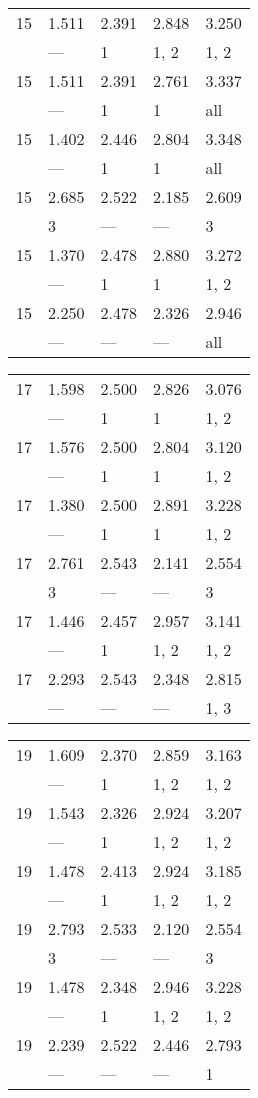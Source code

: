 \begin{tabular}{lllll}
\toprule
 15 & 1.511 & 2.391 & 2.848 & 3.250 \\
    & ---   & 1     & 1, 2  & 1, 2  \\
 15 & 1.511 & 2.391 & 2.761 & 3.337 \\
    & ---   & 1     & 1     & all   \\
 15 & 1.402 & 2.446 & 2.804 & 3.348 \\
    & ---   & 1     & 1     & all   \\
 15 & 2.685 & 2.522 & 2.185 & 2.609 \\
    & 3     & ---   & ---   & 3     \\
 15 & 1.370 & 2.478 & 2.880 & 3.272 \\
    & ---   & 1     & 1     & 1, 2  \\
 15 & 2.250 & 2.478 & 2.326 & 2.946 \\
    & ---   & ---   & ---   & all   \\
\bottomrule
\end{tabular}
\begin{tabular}{lllll}
\toprule
 17 & 1.598 & 2.500 & 2.826 & 3.076 \\
    & ---   & 1     & 1     & 1, 2  \\
 17 & 1.576 & 2.500 & 2.804 & 3.120 \\
    & ---   & 1     & 1     & 1, 2  \\
 17 & 1.380 & 2.500 & 2.891 & 3.228 \\
    & ---   & 1     & 1     & 1, 2  \\
 17 & 2.761 & 2.543 & 2.141 & 2.554 \\
    & 3     & ---   & ---   & 3     \\
 17 & 1.446 & 2.457 & 2.957 & 3.141 \\
    & ---   & 1     & 1, 2  & 1, 2  \\
 17 & 2.293 & 2.543 & 2.348 & 2.815 \\
    & ---   & ---   & ---   & 1, 3  \\
\bottomrule
\end{tabular}
\begin{tabular}{lllll}
\toprule
 19 & 1.609 & 2.370 & 2.859 & 3.163 \\
    & ---   & 1     & 1, 2  & 1, 2  \\
 19 & 1.543 & 2.326 & 2.924 & 3.207 \\
    & ---   & 1     & 1, 2  & 1, 2  \\
 19 & 1.478 & 2.413 & 2.924 & 3.185 \\
    & ---   & 1     & 1, 2  & 1, 2  \\
 19 & 2.793 & 2.533 & 2.120 & 2.554 \\
    & 3     & ---   & ---   & 3     \\
 19 & 1.478 & 2.348 & 2.946 & 3.228 \\
    & ---   & 1     & 1, 2  & 1, 2  \\
 19 & 2.239 & 2.522 & 2.446 & 2.793 \\
    & ---   & ---   & ---   & 1     \\
\bottomrule
\end{tabular}

